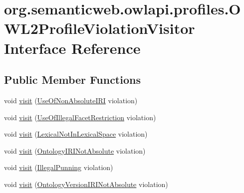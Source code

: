 \hypertarget{interfaceorg_1_1semanticweb_1_1owlapi_1_1profiles_1_1_o_w_l2_profile_violation_visitor}{\section{org.\-semanticweb.\-owlapi.\-profiles.\-O\-W\-L2\-Profile\-Violation\-Visitor Interface Reference}
\label{interfaceorg_1_1semanticweb_1_1owlapi_1_1profiles_1_1_o_w_l2_profile_violation_visitor}
}
\subsection*{Public Member Functions}
\begin{DoxyCompactItemize}
\item 
void \hyperlink{interfaceorg_1_1semanticweb_1_1owlapi_1_1profiles_1_1_o_w_l2_profile_violation_visitor_aa4bbe1fb4eb5d02683fe158877d034e0}{visit} (\hyperlink{classorg_1_1semanticweb_1_1owlapi_1_1profiles_1_1_use_of_non_absolute_i_r_i}{Use\-Of\-Non\-Absolute\-I\-R\-I} violation)
\item 
void \hyperlink{interfaceorg_1_1semanticweb_1_1owlapi_1_1profiles_1_1_o_w_l2_profile_violation_visitor_a5564a29dad58e07ff372e08216161a71}{visit} (\hyperlink{classorg_1_1semanticweb_1_1owlapi_1_1profiles_1_1_use_of_illegal_facet_restriction}{Use\-Of\-Illegal\-Facet\-Restriction} violation)
\item 
void \hyperlink{interfaceorg_1_1semanticweb_1_1owlapi_1_1profiles_1_1_o_w_l2_profile_violation_visitor_a9509f1e06096681b8e39f621e05dc08c}{visit} (\hyperlink{classorg_1_1semanticweb_1_1owlapi_1_1profiles_1_1_lexical_not_in_lexical_space}{Lexical\-Not\-In\-Lexical\-Space} violation)
\item 
void \hyperlink{interfaceorg_1_1semanticweb_1_1owlapi_1_1profiles_1_1_o_w_l2_profile_violation_visitor_aaa9137f5772ea04ba6059b527baa14a5}{visit} (\hyperlink{classorg_1_1semanticweb_1_1owlapi_1_1profiles_1_1_ontology_i_r_i_not_absolute}{Ontology\-I\-R\-I\-Not\-Absolute} violation)
\item 
void \hyperlink{interfaceorg_1_1semanticweb_1_1owlapi_1_1profiles_1_1_o_w_l2_profile_violation_visitor_ab96bb84637b0cc3e066fc066cd15bb6f}{visit} (\hyperlink{classorg_1_1semanticweb_1_1owlapi_1_1profiles_1_1_illegal_punning}{Illegal\-Punning} violation)
\item 
void \hyperlink{interfaceorg_1_1semanticweb_1_1owlapi_1_1profiles_1_1_o_w_l2_profile_violation_visitor_a9b69af2022984f8d81fa297d78d39bea}{visit} (\hyperlink{classorg_1_1semanticweb_1_1owlapi_1_1profiles_1_1_ontology_version_i_r_i_not_absolute}{Ontology\-Version\-I\-R\-I\-Not\-Absolute} violation)

\end{DoxyCompactItemize}
